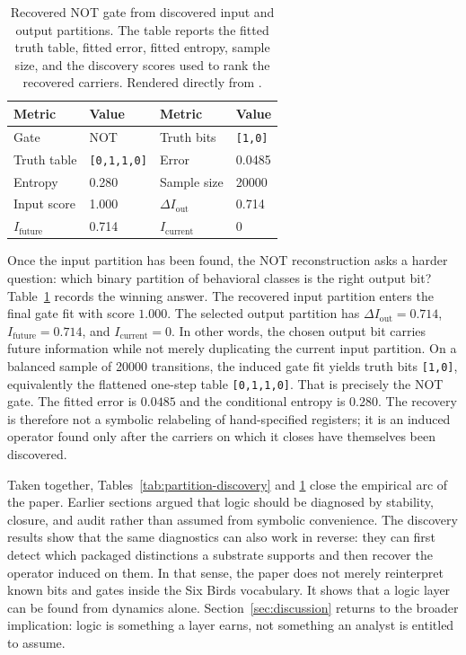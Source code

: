 \documentclass[11pt]{article}
\theoremstyle{definition}
\begin{document}
\begin{table}[tbp]
    \centering
    \caption{Recovered NOT gate from discovered input and output partitions. The table reports the fitted truth table, fitted error, fitted entropy, sample size, and the discovery scores used to rank the recovered carriers. Rendered directly from \protect{}.}
    \label{tab:gate-discovery}
    {\small
\setlength{\tabcolsep}{5pt}
\renewcommand{\arraystretch}{1.12}
\begin{tabularx}{\linewidth}{@{}l X l X@{}}
\toprule
Metric & Value & Metric & Value \\
\midrule
Gate & NOT & Truth bits & \texttt{[1,0]} \\
Truth table & \texttt{[0,1,1,0]} & Error & 0.0485 \\
Entropy & 0.280 & Sample size & 20000 \\
Input score & 1.000 & $\Delta I_{\mathrm{out}}$ & 0.714 \\
$I_{\mathrm{future}}$ & 0.714 & $I_{\mathrm{current}}$ & 0 \\
\bottomrule
\end{tabularx}
}
 \end{table}

Once the input partition has been found, the NOT reconstruction asks a harder question: which binary partition of behavioral classes is the right output bit? Table~\ref{tab:gate-discovery} records the winning answer. The recovered input partition enters the final gate fit with score \(1.000\). The selected output partition has \(\Delta I_{\mathrm{out}}=0.714\), \(I_{\mathrm{future}}=0.714\), and \(I_{\mathrm{current}}=0\). In other words, the chosen output bit carries future information while not merely duplicating the current input partition. On a balanced sample of 20000 transitions, the induced gate fit yields truth bits \texttt{[1,0]}, equivalently the flattened one-step table \texttt{[0,1,1,0]}. That is precisely the NOT gate. The fitted error is \(0.0485\) and the conditional entropy is \(0.280\). The recovery is therefore not a symbolic relabeling of hand-specified registers; it is an induced operator found only after the carriers on which it closes have themselves been discovered.

Taken together, Tables~\ref{tab:partition-discovery} and \ref{tab:gate-discovery} close the empirical arc of the paper. Earlier sections argued that logic should be diagnosed by stability, closure, and audit rather than assumed from symbolic convenience. The discovery results show that the same diagnostics can also work in reverse: they can first detect which packaged distinctions a substrate supports and then recover the operator induced on them. In that sense, the paper does not merely reinterpret known bits and gates inside the Six Birds vocabulary. It shows that a logic layer can be found from dynamics alone. Section~\ref{sec:discussion} returns to the broader implication: logic is something a layer earns, not something an analyst is entitled to assume.
\end{document}
